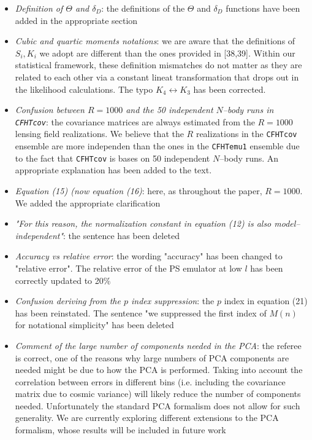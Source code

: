 \documentclass[11pt]{article}
\begin{document}
\begin{itemize}
\item \textit{Definition of $\Theta$ and $\delta_D$}: the definitions of the $\Theta$ and $\delta_D$ functions have been added in the appropriate section
\item \textit{Cubic and quartic moments notations}: we are aware that the definitions of $S_i,K_i$ we adopt are different than the ones provided in [38,39]. Within our statistical framework, these definition mismatches do not matter as they are related to each other via a constant lineat transformation that drops out in the likelihood calculations. The typo $K_4\leftrightarrow K_3$ has been corrected. 
\item \textit{Confusion between $R=1000$ and the 50 independent $N$--body runs in \texttt{CFHTcov}}: the covariance matrices are always estimated from the $R=1000$ lensing field realizations. We believe that the $R$ realizations in the \texttt{CFHTcov} ensemble are more independen than the ones in the \texttt{CFHTemu1} ensemble due to the fact that \texttt{CFHTcov} is bases on 50 independent $N$--body runs. An appropriate explanation has been added to the text. 
\item \textit{Equation (15) (now equation (16)}: here, as throughout the paper, $R=1000$. We added the appropriate clarification
\item \textit{"For this reason, the normalization constant in equation (12) is also model–independent"}: the sentence has been deleted
\item \textit{Accuracy vs relative error}: the wording "accuracy" has been changed to "relative error". The relative error of the PS emulator at low $l$ has been correctly updated to 20\%
\item \textit{Confusion deriving from the $p$ index suppression}: the $p$ index in equation (21) has been reinstated. The sentence "we suppressed the first index of $M(n)$ for notational simplicity" has been deleted  

\item \textit{Comment of the large number of components needed in the PCA}: the referee is correct, one of the reasons why large numbers of PCA components are needed might be due to how the PCA is performed. Taking into account the correlation between errors in different bins (i.e. including the covariance matrix due to cosmic variance) will likely reduce the number of components needed. Unfortunately the standard PCA formalism does not allow for such generality. We are currently exploring different extensions to the PCA formalism, whose results will be included in future work


\end{itemize}
\end{document}
